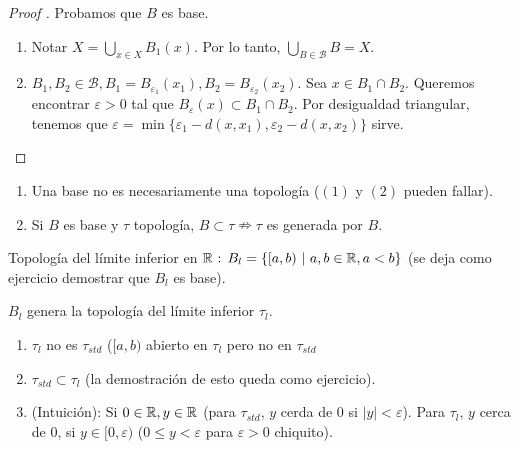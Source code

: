 \begin{proof}[Proof ] Probamos que $B$ es base.
	\begin{enumerate}
		\item Notar $X = \bigcup_{x \in X} B_1 (x)$. Por lo tanto, $\bigcup_{B \in \mathcal{B}} B = X$.

		\item $B_1,B_2 \in \mathcal{B}, B_1 = B_{\varepsilon_1} (x_1), B_2 = B_{\varepsilon_2} (x_2)$. Sea $x \in B_1 \cap B_2$. Queremos encontrar $\varepsilon > 0$ tal que $B_{\varepsilon} (x) \subset B_1 \cap B_2$. Por desigualdad triangular, tenemos que $\varepsilon = \min \{ \varepsilon_1 - d(x,x_1), \varepsilon_2 - d(x,x_2) \}$ sirve.  
	\end{enumerate}
\end{proof}

\begin{note}
	\begin{enumerate}
		\item Una base no es necesariamente una topología ($(1)$ y $(2)$ pueden fallar).

		\item Si $B$ es base y $\tau$ topología, $B \subset \tau \nRightarrow \tau$ es generada por $B$.
	\end{enumerate}
\end{note}

\begin{eg}
	Topología del límite inferior en $\mathbb{R} \text{ : } B_l = \{ [a,b) \text{ | } a,b \in \mathbb{R} , a < b \}$ (se deja como ejercicio demostrar que $B_l$ es base).
\end{eg}

\begin{definition}
	$B_l$ genera la topología del límite inferior $\tau_l$.
\end{definition}

\begin{remark} \text{}
	\begin{enumerate}
		\item $\tau_l$ no es $\tau_{std}$ ($[a,b)$ abierto en $\tau_l$ pero no en $\tau_{std}$

		\item $\tau_{std} \subset \tau_l$ (la demostración de esto queda como ejercicio).

		\item (Intuición): Si $0 \in \mathbb{R}, y \in \mathbb{R}$ (para $\tau_{std}$, $y$ cerda de $0$ si $|y| < \varepsilon$). Para $\tau_l$, $y$ cerca de $0$, si $y \in [0,\varepsilon)$ ($0\leq y < \varepsilon$ para $\varepsilon > 0$ chiquito).
	\end{enumerate}
\end{remark}


